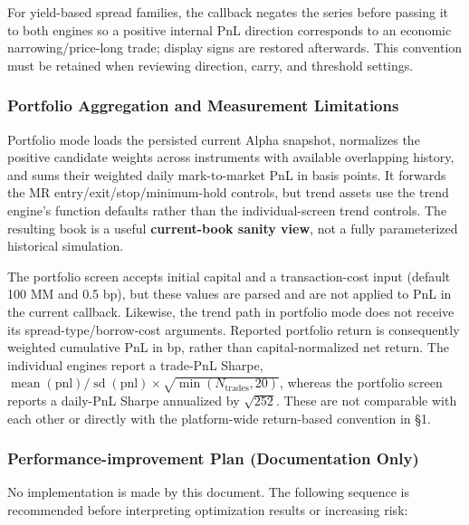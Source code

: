 For yield-based spread families, the callback negates the series before passing it
to both engines so a positive internal PnL direction corresponds to an economic
narrowing/price-long trade; display signs are restored afterwards. This convention
must be retained when reviewing direction, carry, and threshold settings.

\subsubsection{Portfolio Aggregation and Measurement Limitations}

Portfolio mode loads the persisted current Alpha snapshot, normalizes the positive
candidate weights across instruments with available overlapping history, and sums
their weighted daily mark-to-market PnL in basis points. It forwards the MR
entry/exit/stop/minimum-hold controls, but trend assets use the trend engine's
function defaults rather than the individual-screen trend controls. The resulting
book is a useful \textbf{current-book sanity view}, not a fully parameterized historical
simulation.

The portfolio screen accepts initial capital and a transaction-cost input (default
100 MM and 0.5 bp), but these values are parsed and are not applied to PnL in the
current callback. Likewise, the trend path in portfolio mode does not receive its
spread-type/borrow-cost arguments. Reported portfolio return is consequently
weighted cumulative PnL in bp, rather than capital-normalized net return. The
individual engines report a trade-PnL Sharpe,
$\operatorname{mean}(\mathrm{pnl})/\operatorname{sd}(\mathrm{pnl})\times\sqrt{\min(N_{\mathrm{trades}},20)}$,
whereas the portfolio screen reports a daily-PnL Sharpe annualized by
$\sqrt{252}$. These are not comparable with each other or directly with the
platform-wide return-based convention in \S1.

\subsubsection{Performance-improvement Plan (Documentation Only)}

No implementation is made by this document. The following sequence is recommended
before interpreting optimization results or increasing risk:

